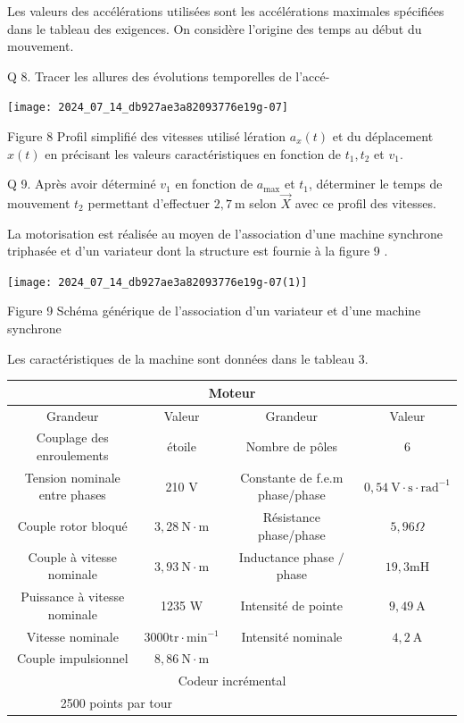 \documentclass[10pt]{article}
\begin{document}
Les valeurs des accélérations utilisées sont les accélérations maximales spécifiées dans le tableau des exigences. On considère l'origine des temps au début du mouvement.

Q 8. Tracer les allures des évolutions temporelles de l'accé-

\begin{center}
\texttt{[image: 2024\_07\_14\_db927ae3a82093776e19g-07]}
\end{center}

Figure 8 Profil simplifié des vitesses utilisé lération $a_{x}(t)$ et du déplacement $x(t)$ en précisant les valeurs caractéristiques en fonction de $t_{1}, t_{2}$ et $v_{1}$.

Q 9. Après avoir déterminé $v_{1}$ en fonction de $a_{\max }$ et $t_{1}$, déterminer le temps de mouvement $t_{2}$ permettant d'effectuer $2,7 \mathrm{~m}$ selon $\vec{X}$ avec ce profil des vitesses.

La motorisation est réalisée au moyen de l'association d'une machine synchrone triphasée et d'un variateur dont la structure est fournie à la figure 9 .

\begin{center}
\texttt{[image: 2024\_07\_14\_db927ae3a82093776e19g-07(1)]}
\end{center}

Figure 9 Schéma générique de l'association d'un variateur et d'une machine synchrone

Les caractéristiques de la machine sont données dans le tableau 3.

\begin{center}
\begin{tabular}{|c|c|c|c|}
\hline
\multicolumn{5}{|c|}{Moteur} \\
\hline
Grandeur & Valeur & Grandeur & Valeur &  \\
\hline
Couplage des enroulements & étoile & Nombre de pôles & 6 &  \\
\hline
Tension nominale entre phases & 210 V & Constante de f.e.m phase/phase & $0,54 \mathrm{~V} \cdot \mathrm{s} \cdot \mathrm{rad}^{-1}$ &  \\
\hline
Couple rotor bloqué & $3,28 \mathrm{~N} \cdot \mathrm{m}$ & Résistance phase/phase & $5,96 \Omega$ &  \\
\hline
Couple à vitesse nominale & $3,93 \mathrm{~N} \cdot \mathrm{m}$ & Inductance phase $/$ phase & $19,3 \mathrm{mH}$ &  \\
\hline
Puissance à vitesse nominale & 1235 W & Intensité de pointe & $9,49 \mathrm{~A}$ &  \\
\hline
Vitesse nominale & $3000 \mathrm{tr} \cdot \mathrm{min}^{-1}$ & Intensité nominale & $4,2 \mathrm{~A}$ &  \\
\hline
Couple impulsionnel & $8,86 \mathrm{~N} \cdot \mathrm{m}$ &  &  &  \\
\hline
\multicolumn{5}{|c|}{Codeur incrémental} \\
\hline
\multicolumn{2}{|c|}{2500 points par tour} &  &  &  \\
\hline
\end{tabular}
\end{center}
\end{document}
